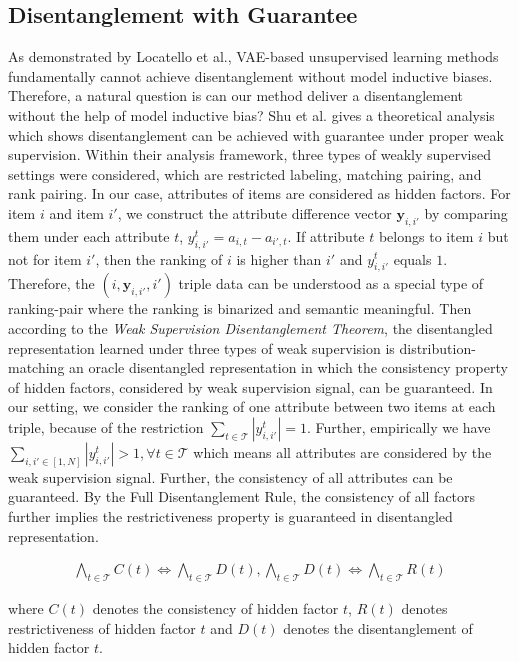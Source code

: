 \subsection{Disentanglement with Guarantee}
As demonstrated by Locatello et al.\cite{Locatello19challengedisentangle}, VAE-based unsupervised learning methods fundamentally cannot achieve disentanglement without model inductive biases. Therefore, a natural question is can our method deliver a disentanglement without the help of model inductive bias? Shu et al.\cite{shu20disentangleguarantee} gives a theoretical analysis which shows disentanglement can be achieved with guarantee under proper weak supervision. Within their analysis framework, three types of weakly supervised settings were considered, which are restricted labeling, matching pairing, and rank pairing. In our case, attributes of items are considered as hidden factors. For item $i$ and item $i'$, we construct the attribute difference vector $\mathbf{y}_{i,i'}$ by comparing them under each attribute $t$, $y_{i,i'}^t = a_{i,t} - a_{i',t}$. If attribute $t$ belongs to item $i$ but not for item $i'$, then the ranking of $i$ is higher than $i'$ and $y_{i,i'}^t$ equals $1$. Therefore, the $(i,\mathbf{y}_{i,i'},i')$ triple data can be understood as a special type of ranking-pair where the ranking is binarized and semantic meaningful. Then according to the \textit{Weak Supervision Disentanglement Theorem}\cite{shu20disentangleguarantee}, the disentangled representation learned under three types of weak supervision is distribution-matching an oracle disentangled representation in which the consistency property of hidden factors, considered by weak supervision signal, can be guaranteed. In our setting, we consider the ranking of one attribute between two items at each triple, because of the restriction $\sum_{t\in\mathcal{T}} |{y}^t_{i,i'}| = 1$. Further, empirically we have $\sum_{i,i' \in [1,N]} |{y}^t_{i,i'}| > 1, \forall t \in \mathcal{T}$ which means all attributes are considered by the weak supervision signal. Further, the consistency of all attributes can be guaranteed. By the Full Disentanglement Rule\cite{shu20disentangleguarantee}, the consistency of all factors further implies the restrictiveness property is guaranteed in disentangled representation.

\begin{equation}
\begin{split}
\bigwedge_{t \in \mathcal{T}} C(t) \iff  \bigwedge_{t \in  \mathcal{T}} D(t), \bigwedge_{t \in \mathcal{T}} D(t) \iff  \bigwedge_{t \in  \mathcal{T}} R(t)
\end{split}
\end{equation}

where $C(t)$ denotes the consistency of hidden factor $t$, $R(t)$ denotes restrictiveness of hidden factor $t$ and $D(t)$ denotes the disentanglement of hidden factor $t$. 